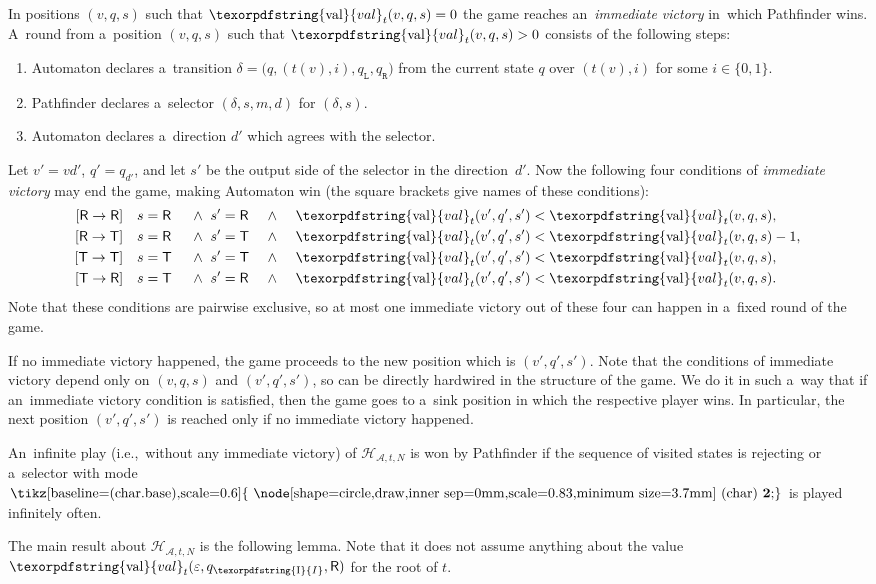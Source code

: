 \documentclass[11pt,a4paper]{amsart}
\theoremstyle{plain}
\theoremstyle{definition}
\theoremstyle{defC}
\theoremstyle{thmC}
\theoremstyle{plain}
\numberwithin{equation}{section}
\numberwithin{equation}{section}
\numberwithin{figure}{section}
\newcommand{\ident}[1]{\ensuremath{\texorpdfstring{\mathrm{\mathnm{#1}}}{#1}}\xspace}
\newcommand{\mathcalsym}[1]{\ensuremath{\mathcal{#1}}\xspace}
\newcommand{\CA}{\mathcalsym{A}}
\newcommand{\CH}{\mathcalsym{H}}
\newcommand{\dL}{\mathtt{{\scriptstyle L}}}
\newcommand{\dR}{\mathtt{{\scriptstyle R}}}
\newcommand{\mathnm}[1]{#1}
\newcommand{\init}{\ident{I}}
\newcommand{\val}{\ident{val}}
\newcommand{\sT}{\mathsf{T}}
\newcommand{\sR}{\mathsf{R}}
\renewcommand\epsilon\varepsilon
\newcommand*\circled[1]{\tikz[baseline=(char.base),scale=0.6]{
            \node[shape=circle,draw,inner sep=0mm,scale=0.83,minimum size=3.7mm] (char) {\textbf{#1}};}}
\newcommand{\fb}{\mathbf{\text{\circled{2}}}}
\newcommand{\imwin}[2]{[#1\to #2]}
\begin{document}
In positions $(v,q,s)$ such that $\val_t(v,q,s)=0$ the game reaches an~\emph{immediate victory} in~which Pathfinder wins.
A~round from a~position $(v,q,s)$ such that $\val_t(v,q,s)>0$ consists of the following steps:
\begin{enumerate}
\item Automaton declares a~transition $\delta=\big(q,(t(v),i),q_\dL,q_\dR\big)$ from the current state $q$ over $(t(v),i)$ for some $i\in\{0,1\}$.
\item Pathfinder declares a~selector $(\delta,s,m,d)$ for $(\delta,s)$.
\item Automaton declares a~direction $d'$ which agrees with the selector.
\end{enumerate}
\noindent %
Let $v'=vd'$, $q'=q_{d'}$, and let $s'$ be the output side of the selector in the direction~$d'$.
Now the following four conditions of \emph{immediate victory} may end the game, making Automaton win (the square brackets give names of these conditions):
\begin{alignat*}{8}
\imwin{\sR}{\sR}\quad&s=\sR &&\ \land\ s'=\sR &&\ \land\ && \val_t(v',q',s')< \val_t(v,q,s),\\
\imwin{\sR}{\sT}\quad&s=\sR &&\ \land\ s'=\sT &&\ \land\ && \val_t(v',q',s')< \val_t(v,q,s)-1,\\
\imwin{\sT}{\sT}\quad&s=\sT &&\ \land\ s'=\sT &&\ \land\ && \val_t(v',q',s')< \val_t(v,q,s),\\
\imwin{\sT}{\sR}\quad&s=\sT &&\ \land\ s'=\sR &&\ \land\ && \val_t(v',q',s')< \val_t(v,q,s).
\end{alignat*}
Note that these conditions are pairwise exclusive, so at most one immediate victory out of these four can happen in a~fixed round of the game.

If no immediate victory happened, the game proceeds to the new position which is $(v',q',s')$.
Note that the conditions of immediate victory depend only on $(v,q,s)$ and $(v',q',s')$, so can be directly hardwired in the structure of the game.
We do it in such a~way that if an~immediate victory condition is satisfied, then the game goes to a~sink position in which the respective player wins.
In particular, the next position $(v',q',s')$ is reached only if no immediate victory happened.

An~infinite play (i.e.,~without any immediate victory) of $\CH_{\CA,t,N}$ is won by Pathfinder if the sequence of visited states is rejecting or a~selector with mode $\fb$ is played infinitely often.

The main result about $\CH_{\CA,t,N}$ is the following lemma.
Note that it does not assume anything about the value $\val_t(\epsilon,q_\init,\sR)$ for the root of $t$.
\end{document}
